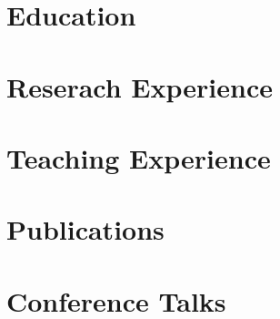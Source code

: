 \documentclass{resume}
\begin{document}
    

%     

\section{Education}
    
    

%     

\section{Reserach Experience}
    
    

%     
%     

\section{Teaching Experience}
    
    

\section{Publications}
    

%     

%     

\section{Conference Talks}
    
\end{document}

